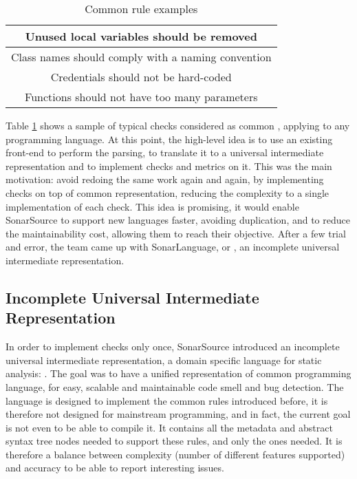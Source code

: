 \begin{table}[h]
\centering
\caption{Common rule examples}
\label{table:common_rules}
	\begin{tabular}{|c|}
		\hline
		Unused local variables should be removed  \\ \hline
		Class names should comply with a naming convention \\ \hline
		Credentials should not be hard-coded \\ \hline
		Functions should not have too many parameters \\ \hline
	\end{tabular}
\end{table}

Table \ref{table:common_rules} shows a sample of typical checks considered as common \cite{JiraSonarSource:2019:Online}, applying to any programming language.
At this point, the high-level idea is to use an existing front-end to perform the parsing, to translate it to a universal intermediate representation and to implement checks and metrics on it.
This was the main motivation: avoid redoing the same work again and again, by implementing checks on top of common representation, reducing the complexity to a single implementation of each check.
This idea is promising, it would enable SonarSource to support new languages faster, avoiding duplication, and to reduce the maintainability cost, allowing them to reach their objective.
After a few trial and error, the team came up with SonarLanguage, or \slang{}, an incomplete universal intermediate representation. 


\subsection{Incomplete Universal Intermediate Representation}
\label{subsec:slang}

In order to implement checks only once, SonarSource introduced an incomplete universal intermediate representation, a domain specific language for static analysis: \textbf{\slang{}}.
The goal was to have a unified representation of common programming language, for easy, scalable and maintainable code smell and bug detection. 
The language is designed to implement the common rules introduced before, it is therefore not designed for mainstream programming, and in fact, the current goal is not even to be able to compile it.
It contains all the metadata and abstract syntax tree nodes needed to support these rules, and only the ones needed.
It is therefore a balance between complexity (number of different features supported) and accuracy to be able to report interesting issues. 


